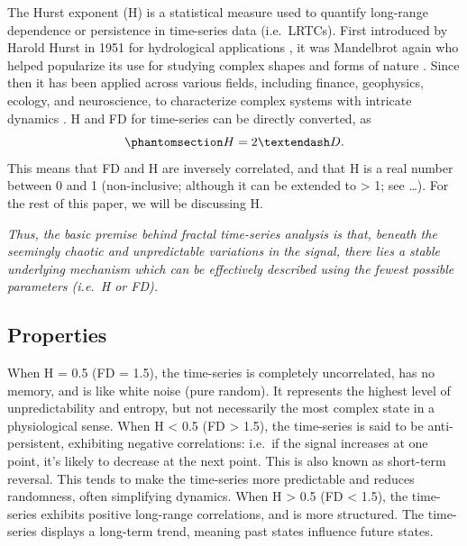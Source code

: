 \documentclass[
  sn-vancouver,
  Numbered,
  referee,
  lineno]{sn-jnl}
\begin{document}
The Hurst exponent (H) is a statistical measure used to quantify
long-range dependence or persistence in time-series data (i.e.~LRTCs).
First introduced by Harold Hurst in 1951 for hydrological applications
\citep{hurstLongTermStorageCapacity1951}, it was Mandelbrot again who
helped popularize its use for studying complex shapes and forms of
nature
\citep{mandelbrotClasseProcessusStochastiques1965, mandelbrotHowLongCoast1967}.
Since then it has been applied across various fields, including finance,
geophysics, ecology, and neuroscience, to characterize complex systems
with intricate dynamics
\citep{molzFractionalBrownianMotion1997, korvinFractalModelsEarth1992, parkSelfSimilarNetworkTraffic2000, gravesBriefHistoryLong2017}.
H and FD for time-series can be directly converted, as
\begin{equation}\phantomsection\label{eq-HRD}{
H=2–D.
}\end{equation} This means that FD and H are inversely correlated, and
that H is a real number between 0 and 1 (non-inclusive; although it can
be extended to \textgreater{} 1; see \ldots). For the rest of this
paper, we will be discussing H.

\emph{Thus, the basic premise behind fractal time-series analysis is
that, beneath the seemingly chaotic and unpredictable variations in the
signal, there lies a stable underlying mechanism which can be
effectively described using the fewest possible parameters (i.e.~H or
FD).}

\subsection{Properties}\label{sec-properties}

When H = 0.5 (FD = 1.5), the time-series is completely uncorrelated, has
no memory, and is like white noise (pure random). It represents the
highest level of unpredictability and entropy, but not necessarily the
most complex state in a physiological sense. When H \textless{} 0.5 (FD
\textgreater{} 1.5), the time-series is said to be anti-persistent,
exhibiting negative correlations: i.e.~if the signal increases at one
point, it's likely to decrease at the next point. This is also known as
short-term reversal. This tends to make the time-series more predictable
and reduces randomness, often simplifying dynamics. When H
\textgreater{} 0.5 (FD \textless{} 1.5), the time-series exhibits
positive long-range correlations, and is more structured. The
time-series displays a long-term trend, meaning past states influence
future states.
\end{document}
